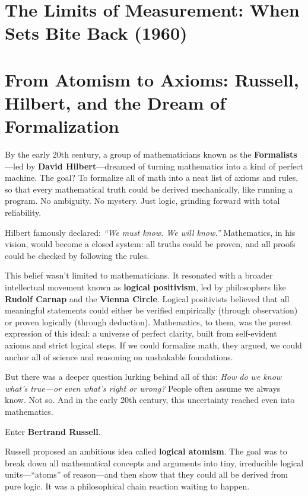 \section{The Limits of Measurement: When Sets Bite Back (1960)}

\section{From Atomism to Axioms: Russell, Hilbert, and the Dream of Formalization}

By the early 20th century, a group of mathematicians known as the \textbf{Formalists}---led by \textbf{David Hilbert}---dreamed of turning mathematics into a kind of perfect machine. The goal? To formalize all of math into a neat list of axioms and rules, so that every mathematical truth could be derived mechanically, like running a program. No ambiguity. No mystery. Just logic, grinding forward with total reliability.

Hilbert famously declared: \textit{``We must know. We will know.''} Mathematics, in his vision, would become a closed system: all truths could be proven, and all proofs could be checked by following the rules.

This belief wasn’t limited to mathematicians. It resonated with a broader intellectual movement known as \textbf{logical positivism}, led by philosophers like \textbf{Rudolf Carnap} and the \textbf{Vienna Circle}. Logical positivists believed that all meaningful statements could either be verified empirically (through observation) or proven logically (through deduction). Mathematics, to them, was the purest expression of this ideal: a universe of perfect clarity, built from self-evident axioms and strict logical steps. If we could formalize math, they argued, we could anchor all of science and reasoning on unshakable foundations.

But there was a deeper question lurking behind all of this: \textit{How do we know what’s true—or even what’s right or wrong?} People often assume we always know. Not so. And in the early 20th century, this uncertainty reached even into mathematics.

Enter \textbf{Bertrand Russell}.

Russell proposed an ambitious idea called \textbf{logical atomism}. The goal was to break down all mathematical concepts and arguments into tiny, irreducible logical units---``atoms'' of reason---and then show that they could all be derived from pure logic. It was a philosophical chain reaction waiting to happen.

